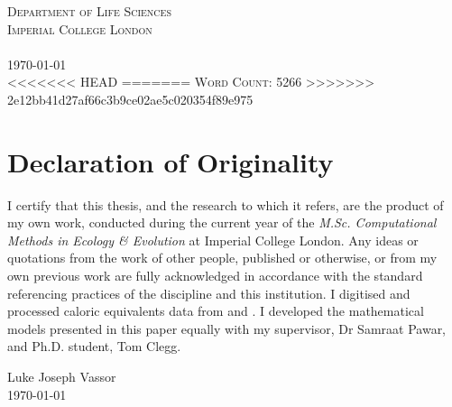 \documentclass[a4paper]{article} %
\begin{document}
\begin{titlepage}
    \textsc{Department of Life Sciences \\ Imperial College London \\ \ }\\[1cm]
    \textsc{\today}\\ %
<<<<<<< HEAD
=======
    \textsc{Word Count: 5266}
>>>>>>> 2e12bb41d27af66c3b9ce02ae5c020354f89e975
    
    \vfill %
    
\end{titlepage}

\section*{Declaration of Originality}\thispagestyle{plain}
    I certify that this thesis, and the research to which it refers, are the product of my own work, conducted during the current year of the \emph{M.Sc. Computational Methods in Ecology \& Evolution} at Imperial College London. Any ideas or quotations from the work of other people, published or otherwise, or from my own previous work are fully acknowledged in accordance with the standard referencing practices of the discipline and this institution. I digitised and processed caloric equivalents data from \textcite{Cummins1971} and \textcite{Steimle1980}. I developed the mathematical models presented in this paper equally with my supervisor, Dr Samraat Pawar, and Ph.D. student, Tom Clegg.

    \vspace{3cm}
    \begin{flushright}
        Luke Joseph Vassor \\
        \today
    \end{flushright}

\end{document}
